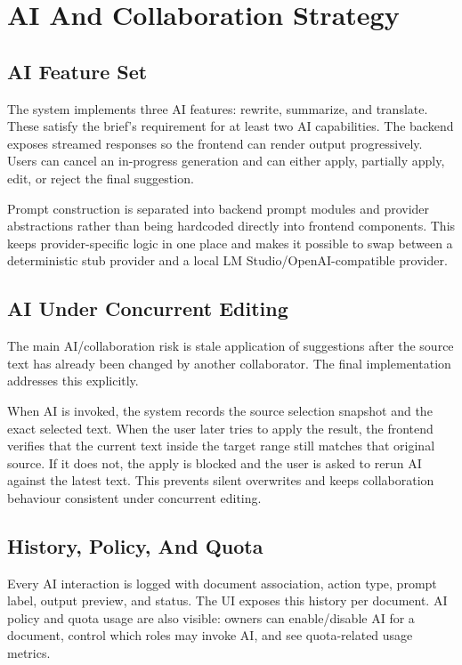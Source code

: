 \chapter{AI And Collaboration Strategy}

\section{AI Feature Set}

The system implements three AI features: rewrite, summarize, and translate. These satisfy the brief's
requirement for at least two AI capabilities. The backend exposes streamed responses so the frontend can
render output progressively. Users can cancel an in-progress generation and can either apply, partially
apply, edit, or reject the final suggestion.

Prompt construction is separated into backend prompt modules and provider abstractions rather than being
hardcoded directly into frontend components. This keeps provider-specific logic in one place and makes it
possible to swap between a deterministic stub provider and a local LM Studio/OpenAI-compatible provider.

\section{AI Under Concurrent Editing}

The main AI/collaboration risk is stale application of suggestions after the source text has already been
changed by another collaborator. The final implementation addresses this explicitly.

When AI is invoked, the system records the source selection snapshot and the exact selected text. When the
user later tries to apply the result, the frontend verifies that the current text inside the target range
still matches that original source. If it does not, the apply is blocked and the user is asked to rerun AI
against the latest text. This prevents silent overwrites and keeps collaboration behaviour consistent under
concurrent editing.

\section{History, Policy, And Quota}

Every AI interaction is logged with document association, action type, prompt label, output preview, and
status. The UI exposes this history per document. AI policy and quota usage are also visible: owners can
enable/disable AI for a document, control which roles may invoke AI, and see quota-related usage metrics.
